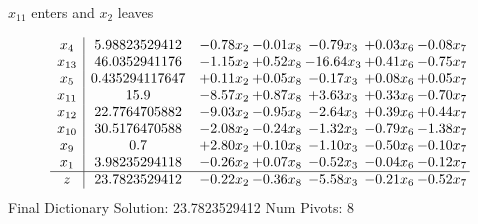 \documentclass[9pt]{article}
\begin{document}
 $ x_{11} $ enters and $ x_{2} $ leaves 

 \[\begin{array}{c| c c@{\hskip 2pt} c@{\hskip 2pt} c@{\hskip 2pt} c@{\hskip 2pt} c@{\hskip 2pt} }
 x_{4}   &  5.98823529412 & -0.78 x_{2} & -0.01 x_{8} & -0.79 x_{3} & +  0.03 x_{6} & -0.08 x_{7}\\
 x_{13}   &  46.0352941176 & -1.15 x_{2} & +  0.52 x_{8} & -16.64 x_{3} & +  0.41 x_{6} & -0.75 x_{7}\\
 x_{5}   &  0.435294117647 & +  0.11 x_{2} & +  0.05 x_{8} & -0.17 x_{3} & +  0.08 x_{6} & +  0.05 x_{7}\\
 x_{11}   &  15.9 & -8.57 x_{2} & +  0.87 x_{8} & +  3.63 x_{3} & +  0.33 x_{6} & -0.70 x_{7}\\
 x_{12}   &  22.7764705882 & -9.03 x_{2} & -0.95 x_{8} & -2.64 x_{3} & +  0.39 x_{6} & +  0.44 x_{7}\\
 x_{10}   &  30.5176470588 & -2.08 x_{2} & -0.24 x_{8} & -1.32 x_{3} & -0.79 x_{6} & -1.38 x_{7}\\
 x_{9}   &  0.7 & +  2.80 x_{2} & +  0.10 x_{8} & -1.10 x_{3} & -0.50 x_{6} & -0.10 x_{7}\\
 x_{1}   &  3.98235294118 & -0.26 x_{2} & +  0.07 x_{8} & -0.52 x_{3} & -0.04 x_{6} & -0.12 x_{7}\\
\hline
z    &  23.7823529412 & -0.22 x_{2} & -0.36 x_{8} & -5.58 x_{3} & -0.21 x_{6} & -0.52 x_{7}\\
\end{array}\]
Final Dictionary
Solution:  23.7823529412
Num Pivots:  8
\end{document}
